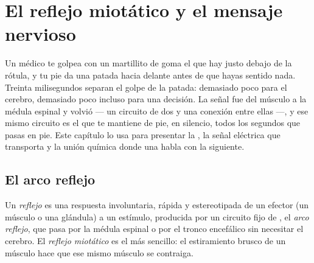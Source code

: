 \chapter{El reflejo miotático y el mensaje nervioso}\label{ch:g12:stretch-reflex}

Un médico te golpea con un martillito de goma el  que hay justo
debajo de la rótula, y tu pie da una patada hacia delante antes de que
hayas sentido nada. Treinta milisegundos separan el golpe de la
patada: demasiado poco para el cerebro, demasiado poco incluso para
una decisión. La señal fue del músculo a la médula espinal y volvió ---
un circuito de dos  y una conexión entre ellas ---, y ese mismo
circuito es el que te mantiene de pie, en silencio, todos los segundos
que pasas en pie. Este capítulo lo usa para presentar la , la
señal eléctrica que transporta y la unión química donde una 
habla con la siguiente.

\section{El arco reflejo}

\begin{definition}[Reflejo]\label{def:g12:stretch-reflex:reflex}
Un \emph{reflejo} es una respuesta involuntaria, rápida
y estereotipada de un efector (un músculo o una glándula) a un
estímulo, producida por un circuito fijo de , el \emph{arco
reflejo}, que pasa por la médula espinal o por el
tronco encefálico sin necesitar el cerebro. El \emph{reflejo
miotático} es el más sencillo: el
estiramiento brusco de un músculo hace que ese mismo músculo se
contraiga.
\end{definition}

